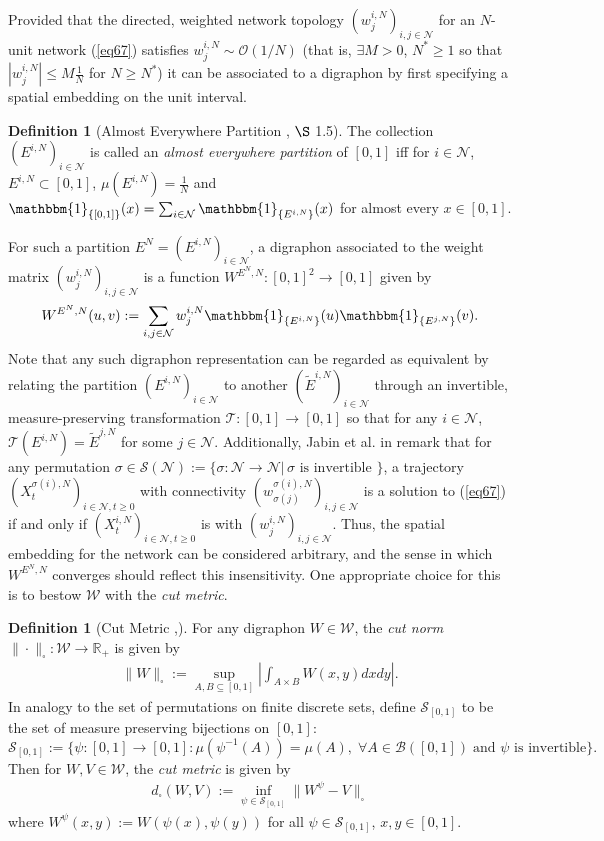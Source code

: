 \documentclass[12pt, oneside]{report}
\newcommand{\mbb}[1]{\mathbb{#1}}
\newcommand{\1}[1]{\mathbbm{1}_{\{#1\}}}
\newcommand{\mc}[1]{\mathcal{#1}}
\theoremstyle{definition}
\newtheorem{definition}[theorem]{Definition}
\begin{document}
Provided that the directed, weighted network topology
$(w^{i,N}_j)_{i,j\in\mc{N}}$ for an $N$-unit network (\ref{eq67}) satisfies
$w^{i,N}_j\sim\mc{O}(1/N)$ (that is, $\exists M>0$, $N^\ast\geq 1$ so that
$|w^{i,N}_j|\leq M\frac{1}{N}$ for $N\geq N^\ast$) it can be associated to a
digraphon by first specifying a spatial embedding on the unit interval.
\begin{definition}[Almost Everywhere Partition \cite{Jabin_Poyato_Soler_2021}, $\S$ 1.5]\label{def28}
    The collection $(E^{i,N})_{i\in\mc{N}}$ is called an \textit{almost
    everywhere partition} of $[0,1]$ iff for $i\in\mc{N}$,
    $E^{i,N}\subset[0,1]$, $\mu(E^{i,N})=\frac{1}{N}$ and
    $\1{[0,1]}(x)=\sum_{i\in\mc{N}}\1{E^{i,N}}(x)$ for almost every $x\in[0,1]$.
\end{definition}
For such a partition $E^N=(E^{i,N})_{i\in\mc{N}}$, a digraphon associated to the
weight matrix $(w^{i,N}_j)_{i,j\in\mc{N}}$ is a function
$W^{E^N,N}:[0,1]^2\rightarrow[0,1]$ given by
\begin{align}
    W^{E^N,N}(u,v):=\sum_{i,j\in\mc{N}}w^{i,N}_j\1{E^{i,N}}(u)\1{E^{j,N}}(v).
\end{align}
Note that any such digraphon representation can be regarded as equivalent by
relating the partition $(E^{i,N})_{i\in\mc{N}}$ to another
$(\tilde{E}^{i,N})_{i\in\mc{N}}$ through an invertible, measure-preserving
transformation $\mc{T}:[0,1]\rightarrow[0,1]$ so that for any $i\in\mc{N}$,
$\mc{T}(E^{i,N})=\tilde{E}^{j,N}$ for some $j\in\mc{N}$. Additionally, Jabin et
al. in \cite{Jabin_Poyato_Soler_2021} remark that for any permutation
$\sigma\in\mc{S}(\mc{N}):=\{\sigma:\mc{N}\rightarrow\mc{N}|\,\sigma\text{ is
invertible }\}$, a trajectory $(X^{\sigma(i),N}_t)_{i\in\mc{N},t\geq 0}$ with
connectivity $(w^{\sigma(i),N}_{\sigma(j)})_{i,j\in\mc{N}}$ is a solution to
(\ref{eq67}) if and only if $(X^{i,N}_t)_{i\in\mc{N},t\geq 0}$ is with
$(w^{i,N}_j)_{i,j\in\mc{N}}$. Thus, the spatial embedding for the network can be
considered arbitrary, and the sense in which $W^{E^N,N}$ converges should
reflect this insensitivity. One appropriate choice for this is to bestow
$\mc{W}$ with the \textit{cut metric}.
\begin{definition}[Cut Metric
    {\cite[ch.8]{Lovasz_2012},\cite{Gao_Caines_2019}}]\label{def27} For any
    digraphon $W\in\mc{W}$, the \textit{cut norm}
    $\|\cdot\|_\square:\mc{W}\rightarrow\mbb{R}_+$ is given by
    \begin{align*}
        \|W\|_\square:=\sup_{A,B\subseteq [0,1]}\left|\int_{A\times B}W(x,y)dxdy\right|.
    \end{align*}
    In analogy to the set of permutations on finite discrete sets, define
    $\mc{S}_{[0,1]}$ to be the set of measure preserving bijections on $[0,1]$:
    \[\mc{S}_{[0,1]}:=\{\psi:[0,1]\rightarrow[0,1]:\mu(\psi^{-1}(A))=\mu(A),\;\forall
    A\in\mc{B}([0,1])\;\text{and $\psi$ is invertible}\}.\] Then for
    $W,V\in\mc{W}$, the \textit{cut metric} is given by
    \begin{align*}
        d_\square(W,V):= \inf_{\psi\in\mc{S}_{[0,1]}}\|W^\psi-V\|_{\square}
    \end{align*}
    where $W^\psi(x,y):=W(\psi(x),\psi(y))$ for all $\psi\in\mc{S}_{[0,1]}$,
    $x,y\in[0,1]$.
\end{definition}
\end{document}
